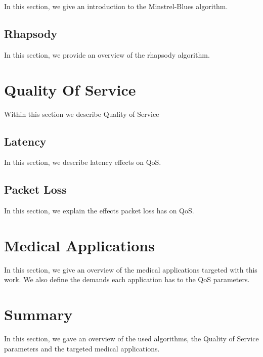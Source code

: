 In this section, we give an introduction to the Minstrel-Blues algorithm.

\subsection{Rhapsody}
\label{ssec:related_work:rhapsody}
%

In this section, we provide an overview of the rhapsody algorithm.


\section{Quality Of Service}
\label{sec:related_work:qos}
%
Within this section we describe Quality of Service

\subsection{Latency}
\label{ssec:related_work:latency}
%
In this section, we describe latency effects on QoS.
%


\subsection{Packet Loss}
\label{ssec:related_work:packet_loss}
%
In this section, we explain the effects packet loss has on QoS.
%

%
\section{Medical Applications}
\label{ssec:related_work:medical_applications}
%
In this section, we give an overview of the medical applications targeted with this work.
We also define the demands each application has to the QoS parameters.
%


\section{Summary}

In this section, we gave an overview of the used algorithms, the Quality of Service parameters and the targeted medical applications.
%


